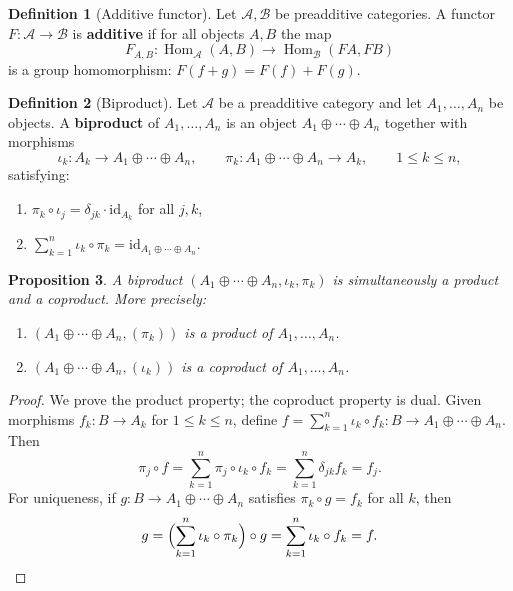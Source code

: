 \documentclass[a4paper,12pt]{book}
\DeclareMathOperator{\Hom}{Hom}
\newcommand{\id}{\mathrm{id}}
\theoremstyle{definition}
\newtheorem{definition}{Definition}[section]
\theoremstyle{plain}
\newtheorem{proposition}[definition]{Proposition}
\theoremstyle{remark}
\begin{document}
\begin{definition}[Additive functor]\label{def:additive-functor}
Let $\mathcal{A}, \mathcal{B}$ be preadditive categories. A functor
$F \colon \mathcal{A} \to \mathcal{B}$ is \textbf{additive} if for all objects $A, B$
the map
\[
    F_{A,B} \colon \Hom_{\mathcal{A}}(A,B) \longrightarrow \Hom_{\mathcal{B}}(FA, FB)
\]
is a group homomorphism: $F(f + g) = F(f) + F(g)$.
\end{definition}

\begin{definition}[Biproduct]\label{def:biproduct}
Let $\mathcal{A}$ be a preadditive category and let $A_1, \ldots, A_n$ be objects.
A \textbf{biproduct} of $A_1, \ldots, A_n$ is an object $A_1 \oplus \cdots \oplus A_n$
together with morphisms
\[
    \iota_k \colon A_k \to A_1 \oplus \cdots \oplus A_n, \qquad
    \pi_k \colon A_1 \oplus \cdots \oplus A_n \to A_k, \qquad 1 \leq k \leq n,
\]
satisfying:
\begin{enumerate}
    \item $\pi_k \circ \iota_j = \delta_{jk} \cdot \id_{A_k}$ for all $j, k$,
    \item $\sum_{k=1}^n \iota_k \circ \pi_k = \id_{A_1 \oplus \cdots \oplus A_n}$.
\end{enumerate}
\end{definition}

\begin{proposition}\label{prop:biproduct-universal}
A biproduct $(A_1 \oplus \cdots \oplus A_n, \iota_k, \pi_k)$ is simultaneously
a product and a coproduct. More precisely:
\begin{enumerate}
    \item $(A_1 \oplus \cdots \oplus A_n, (\pi_k))$ is a product of $A_1, \ldots, A_n$.
    \item $(A_1 \oplus \cdots \oplus A_n, (\iota_k))$ is a coproduct of $A_1, \ldots, A_n$.
\end{enumerate}
\end{proposition}

\begin{proof}
We prove the product property; the coproduct property is dual. Given morphisms
$f_k \colon B \to A_k$ for $1 \leq k \leq n$, define
$f = \sum_{k=1}^n \iota_k \circ f_k \colon B \to A_1 \oplus \cdots \oplus A_n$.
Then
\[
    \pi_j \circ f = \sum_{k=1}^n \pi_j \circ \iota_k \circ f_k
    = \sum_{k=1}^n \delta_{jk} f_k = f_j.
\]
For uniqueness, if $g \colon B \to A_1 \oplus \cdots \oplus A_n$ satisfies
$\pi_k \circ g = f_k$ for all $k$, then
\[
    g = \Bigl(\sum_{k=1}^n \iota_k \circ \pi_k\Bigr) \circ g
    = \sum_{k=1}^n \iota_k \circ f_k = f. \qedhere
\]
\end{proof}
\end{document}

